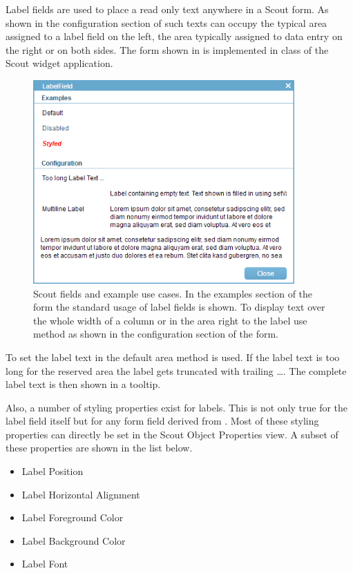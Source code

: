 \documentclass[a4paper,10pt,twoside]{book}
\begin{document}
{Label fields are used to place a read only text anywhere in a Scout form. 
As shown in the configuration section of  such texts can occupy the typical area assigned to a label field on the left, the area typically assigned to data entry on the right or on both sides.
The form shown in  is implemented in class  of the Scout widget application.

\begin{figure}
\includegraphics[width=10cm]{labelfield.png}
\caption{Scout fields and example use cases. 
In the examples section of the form the standard usage of label fields is shown.
To display text over the whole width of a column or in the area right to the label use method  as shown in the configuration section of the form.}
\end{figure}

To set the label text in the default area method  is used. 
If the label text is too long for the reserved area the label gets truncated with trailing \dots.
The complete label text is then shown in a tooltip.

Also, a number of  styling properties exist for labels.
This is not only true for the label field itself but for any form field derived from .
Most of these styling properties can directly be set in the Scout Object Properties view.
A subset of these properties are shown in the list below.

\begin{itemize}
  \item Label Position
  \item Label Horizontal Alignment
  \item Label Foreground Color
  \item Label Background Color
  \item Label Font
\end{itemize}

}
\end{document}
